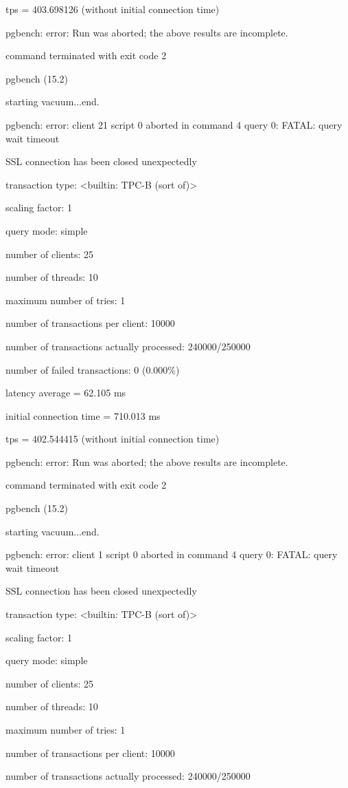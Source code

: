 tps = 403.698126 (without initial connection time)

pgbench: error: Run was aborted; the above results are incomplete.

command terminated with exit code 2

pgbench (15.2)

starting vacuum...end.

pgbench: error: client 21 script 0 aborted in command 4 query 0: FATAL:  query wait timeout

SSL connection has been closed unexpectedly

transaction type: <builtin: TPC-B (sort of)>

scaling factor: 1

query mode: simple

number of clients: 25

number of threads: 10

maximum number of tries: 1

number of transactions per client: 10000

number of transactions actually processed: 240000/250000

number of failed transactions: 0 (0.000\%)

latency average = 62.105 ms

initial connection time = 710.013 ms

tps = 402.544415 (without initial connection time)

pgbench: error: Run was aborted; the above results are incomplete.

command terminated with exit code 2

pgbench (15.2)

starting vacuum...end.

pgbench: error: client 1 script 0 aborted in command 4 query 0: FATAL:  query wait timeout

SSL connection has been closed unexpectedly

transaction type: <builtin: TPC-B (sort of)>

scaling factor: 1

query mode: simple

number of clients: 25

number of threads: 10

maximum number of tries: 1

number of transactions per client: 10000

number of transactions actually processed: 240000/250000

